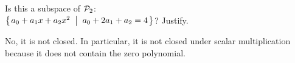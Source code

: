 

\begin{Exercise}[
name={},
title={}, 
difficulty=0,
origin={\cite{JH}}]
   Is this a subspace of \( \mathcal{P}_2 \):\\
    \( \mbox{$\left\{\hspace{0.1em}a_0+a_1x+a_2x^2\;\;\middle|\;\; a_0+2a_1+a_2=4\hspace{0.1em}\right\}$} \)? Justify.
\end{Exercise}

\begin{Answer}
No, it is not closed.
      In particular, it is not closed under scalar multiplication because it
      does not contain the zero polynomial.  

\end{Answer}
